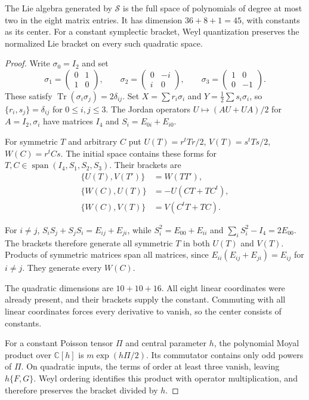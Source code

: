 \begin{proposition}\label{mht:prop:matrix-quadratic-closure}
The Lie algebra generated by $\mathcal S$ is the full space of
polynomials of degree at most two in the eight matrix entries.
It has dimension $36+8+1=45$, with constants as its center.
For a constant symplectic bracket, Weyl quantization preserves
the normalized Lie bracket on every such quadratic space.
\end{proposition}
\begin{proof}
Write $\sigma_0=I_2$ and set
\[
 \sigma_1=\begin{pmatrix}0&1\\1&0\end{pmatrix},\qquad
 \sigma_2=\begin{pmatrix}0&-i\\i&0\end{pmatrix},\qquad
 \sigma_3=\begin{pmatrix}1&0\\0&-1\end{pmatrix}.
\]
These satisfy $\operatorname{Tr}(\sigma_i\sigma_j)=2\delta_{ij}$.
Set $X=\sum r_i\sigma_i$ and $Y=\frac12\sum s_i\sigma_i$,
so $\{r_i,s_j\}=\delta_{ij}$ for $0\leq i,j\leq3$.
The Jordan operators $U\mapsto(AU+UA)/2$ for
$A=I_2,\sigma_i$ have matrices $I_4$ and
$S_i=E_{0i}+E_{i0}$.

For symmetric $T$ and arbitrary $C$ put
$U(T)=r^tTr/2$, $V(T)=s^tTs/2$, $W(C)=r^tCs$.
The initial space contains these forms for
$T,C\in\operatorname{span}(I_4,S_1,S_2,S_3)$. Their brackets are
\begin{align*}
 \{U(T),V(T')\}&=W(TT'),\\
 \{W(C),U(T)\}&=-U(CT+TC^t),\\
 \{W(C),V(T)\}&=V(C^tT+TC).
\end{align*}

For $i\ne j$, $S_iS_j+S_jS_i=E_{ij}+E_{ji}$, while
$S_i^2=E_{00}+E_{ii}$ and $\sum_iS_i^2-I_4=2E_{00}$.
The brackets therefore generate all symmetric $T$ in both
$U(T)$ and $V(T)$. Products of symmetric matrices span all
matrices, since $E_{ii}(E_{ij}+E_{ji})=E_{ij}$ for $i\ne j$.
They generate every $W(C)$.

The quadratic dimensions are $10+10+16$.
All eight linear coordinates were already present,
and their brackets supply the constant. Commuting with all
linear coordinates forces every derivative to vanish, so the
center consists of constants.

For a constant Poisson tensor $\Pi$ and central parameter $h$,
the polynomial Moyal product over $\mathbb C[h]$ is
$m\exp(h\Pi/2)$. Its commutator contains only odd powers of
$\Pi$. On quadratic inputs, the terms of order at least three
vanish, leaving $h\{F,G\}$. Weyl ordering identifies this
product with operator multiplication, and therefore preserves
the bracket divided by $h$.
\end{proof}

